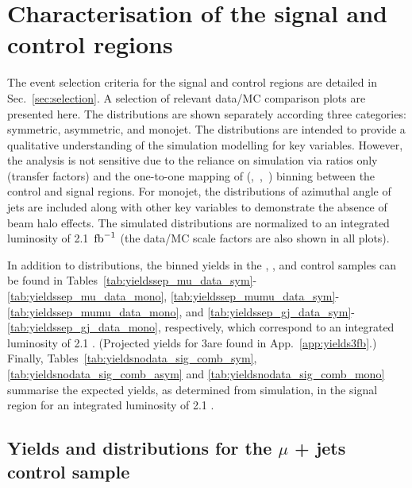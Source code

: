 \section{Characterisation of the signal and control regions}
\label{sec:yields}

The event selection criteria for the signal and control regions are
detailed in Sec.~\ref{sec:selection}. A selection of relevant data/MC
comparison plots are presented here. The distributions are shown
separately according three \njet categories: symmetric, asymmetric,
and monojet. The distributions are intended to provide a qualitative
understanding of the simulation modelling for key variables. However, 
the analysis is not sensitive due to the reliance on simulation via
ratios only (\ie transfer factors) and the one-to-one mapping of
(\njet,~\nb,~\scalht) binning between the control and signal
regions. For monojet, the distributions of azimuthal angle of jets are 
included along with other key variables to demonstrate the absence of 
beam halo effects. The simulated distributions are normalized to an integrated
luminosity of 2.1~$\text{fb}^{-1}$ (the data/MC scale factors are also shown
in all plots).

In addition to distributions, the binned yields in the \mj, \mmj, and
\gj control samples can be found in
Tables~\ref{tab:yieldssep_mu_data_sym}-\ref{tab:yieldssep_mu_data_mono},
\ref{tab:yieldssep_mumu_data_sym}-\ref{tab:yieldssep_mumu_data_mono},
and \ref{tab:yieldssep_gj_data_sym}-\ref{tab:yieldssep_gj_data_mono},
respectively, which correspond to an integrated luminosity of 2.1
\ifb. (Projected yields for 3\ifb are found in
App.~\ref{app:yields3fb}.) Finally,
Tables~\ref{tab:yieldsnodata_sig_comb_sym},
\ref{tab:yieldsnodata_sig_comb_asym} and \ref{tab:yieldsnodata_sig_comb_mono} summarise the expected yields, as
determined from simulation, in the signal region for an integrated
luminosity of 2.1 \ifb.

\clearpage
\subsection{Yields and distributions for the $\mu$ + jets control sample}





